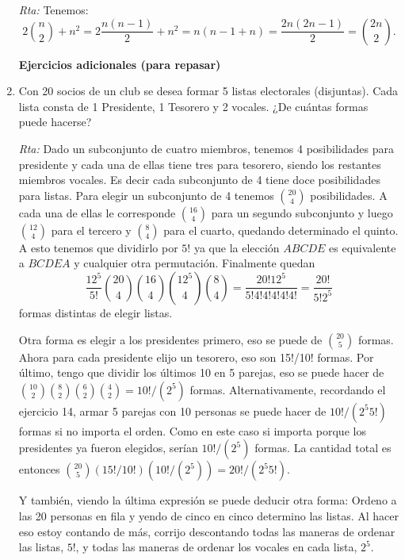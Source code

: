 \documentclass[a4paper,12pt,twoside,spanish,reqno]{amsbook}
\numberwithin{equation}{section}
\begin{document}
\begin{enumerate}
\noindent\textit{Rta:} Tenemos: $$2\binom{n}{2}+n^2=2\frac{n(n-1)}{2}+n^2={n(n-1+n)}=\frac{2n(2n-1)}{2}=\binom{2n}{2}.$$

\medskip


\begin{center}
    \textbf{Ejercicios adicionales (para repasar)}
\end{center}


\medskip

\item Con 20 socios de un club se desea formar 5 listas electorales (disjuntas). Cada lista
consta de 1 Presidente, 1 Tesorero y 2 vocales. ¿De cuántas formas puede hacerse?

\noindent\textit{Rta:} Dado un subconjunto de cuatro miembros, tenemos 4 posibilidades para presidente y cada una de ellas tiene tres para tesorero, siendo los restantes miembros vocales. Es decir cada subconjunto de 4 tiene doce posibilidades para listas. Para elegir un subconjunto de 4 tenemos $\binom{20}{4}$ posibilidades. A cada una de ellas le corresponde $\binom{16}{4}$ para un segundo subconjunto y luego $\binom{12}{4}$ para el tercero y $\binom{8}{4}$ para el cuarto, quedando determinado el quinto. A esto tenemos que dividirlo por $5!$ ya que la elección $ABCDE$ es equivalente a  $BCDEA$ y cualquier otra permutación. 
Finalmente quedan $$\frac{12^5}{5!}\binom{20}{4}\binom{16}{4}\binom{12^5}{4}\binom{8}{4}=\frac{20!12^5}{5!4!4!4!4!4!}=\frac{20!}{5!2^5}$$ formas distintas de elegir listas.

Otra forma es elegir a los presidentes primero, eso se puede de $\binom{20}{5}$ formas. Ahora para cada presidente elijo un tesorero, eso son 15!/10! formas. Por último, tengo que dividir los últimos 10 en 5 parejas, eso se puede hacer de ${10 \choose 2} {8 \choose 2} {6 \choose 2} {4 \choose 2} = 10! / ( 2^5)$ formas. Alternativamente, recordando el ejercicio 14, armar 5 parejas con 10 personas se puede hacer de $10! / ( 2^5 5!)$ formas si no importa el orden. Como en este caso si importa porque los presidentes ya fueron elegidos, serían $10! / ( 2^5)$ formas. La cantidad total es entonces $\binom{20}{5} (15! / 10!) ( 10! / ( 2^5) ) = 20! / (2^5 5!)$.

Y también, viendo la última expresión se puede deducir otra forma: Ordeno a las 20 personas en fila y yendo de cinco en cinco determino las listas. Al hacer eso estoy contando de más, corrijo descontando todas las maneras de ordenar las listas, $5!$, y todas las maneras de ordenar los vocales en cada lista, $2^5$.


\end{enumerate}
\end{document}
